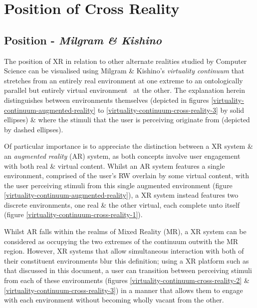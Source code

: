 \section{Position of Cross Reality}

\subsection{Position - \textit{Milgram \& Kishino}}
The position of XR in relation to other alternate realities studied by Computer Science can be visualised using Milgram \& Kishino's \textit{virtuality continuum} that stretches from an entirely real environment at one extreme to an ontologically parallel but entirely virtual environment~\cite{Qvortrup2002} at the other. The explanation herein distinguishes between environments themselves (depicted in figures \ref{virtuality-continuum-augmented-reality} to \ref{virtuality-continuum-cross-reality-3} by solid ellipses) \& where the stimuli that the user is perceiving originate from (depicted by dashed ellipses).


Of particular importance is to appreciate the distinction between a XR system \& an \textit{augmented reality} (AR) system, as both concepts involve user engagement with both real \& virtual content. Whilst an AR system features a single environment, comprised of the user's RW overlain by some virtual content, with the user perceiving stimuli from this single augmented environment (figure \ref{virtuality-continuum-augmented-reality}), a XR system instead features two discrete environments, one real \& the other virtual, each complete unto itself (figure \ref{virtuality-continuum-cross-reality-1}).

Whilst AR falls within the realms of Mixed Reality (MR), a XR system can be considered as occupying the two extremes of the continuum outwith the MR region. However, XR systems that allow simultaneous interaction with both of their constituent environments blur this definition; using a XR platform such as that discussed in this document, a user can transition between perceiving stimuli from each of these environments (figures \ref{virtuality-continuum-cross-reality-2} \& \ref{virtuality-continuum-cross-reality-3}) in a manner that allows them to engage with each environment without becoming wholly vacant from the other.


